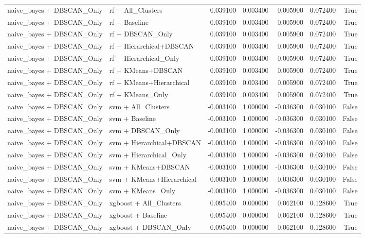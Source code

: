 \begin{tabular}{llrrrrr}
naive_bayes + DBSCAN_Only & rf + All_Clusters & 0.039100 & 0.003400 & 0.005900 & 0.072400 & True \\
naive_bayes + DBSCAN_Only & rf + Baseline & 0.039100 & 0.003400 & 0.005900 & 0.072400 & True \\
naive_bayes + DBSCAN_Only & rf + DBSCAN_Only & 0.039100 & 0.003400 & 0.005900 & 0.072400 & True \\
naive_bayes + DBSCAN_Only & rf + Hierarchical+DBSCAN & 0.039100 & 0.003400 & 0.005900 & 0.072400 & True \\
naive_bayes + DBSCAN_Only & rf + Hierarchical_Only & 0.039100 & 0.003400 & 0.005900 & 0.072400 & True \\
naive_bayes + DBSCAN_Only & rf + KMeans+DBSCAN & 0.039100 & 0.003400 & 0.005900 & 0.072400 & True \\
naive_bayes + DBSCAN_Only & rf + KMeans+Hierarchical & 0.039100 & 0.003400 & 0.005900 & 0.072400 & True \\
naive_bayes + DBSCAN_Only & rf + KMeans_Only & 0.039100 & 0.003400 & 0.005900 & 0.072400 & True \\
naive_bayes + DBSCAN_Only & svm + All_Clusters & -0.003100 & 1.000000 & -0.036300 & 0.030100 & False \\
naive_bayes + DBSCAN_Only & svm + Baseline & -0.003100 & 1.000000 & -0.036300 & 0.030100 & False \\
naive_bayes + DBSCAN_Only & svm + DBSCAN_Only & -0.003100 & 1.000000 & -0.036300 & 0.030100 & False \\
naive_bayes + DBSCAN_Only & svm + Hierarchical+DBSCAN & -0.003100 & 1.000000 & -0.036300 & 0.030100 & False \\
naive_bayes + DBSCAN_Only & svm + Hierarchical_Only & -0.003100 & 1.000000 & -0.036300 & 0.030100 & False \\
naive_bayes + DBSCAN_Only & svm + KMeans+DBSCAN & -0.003100 & 1.000000 & -0.036300 & 0.030100 & False \\
naive_bayes + DBSCAN_Only & svm + KMeans+Hierarchical & -0.003100 & 1.000000 & -0.036300 & 0.030100 & False \\
naive_bayes + DBSCAN_Only & svm + KMeans_Only & -0.003100 & 1.000000 & -0.036300 & 0.030100 & False \\
naive_bayes + DBSCAN_Only & xgboost + All_Clusters & 0.095400 & 0.000000 & 0.062100 & 0.128600 & True \\
naive_bayes + DBSCAN_Only & xgboost + Baseline & 0.095400 & 0.000000 & 0.062100 & 0.128600 & True \\
naive_bayes + DBSCAN_Only & xgboost + DBSCAN_Only & 0.095400 & 0.000000 & 0.062100 & 0.128600 & True \\

\end{tabular}
